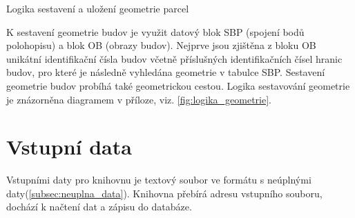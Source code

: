 \begin{algorithm}
\caption{Logika sestavení a uložení geometrie parcel}
\label{alg:sestaveni_parcely}
	\begin{algorithmic}[1]
		\ENDFOR
		\ELSE
		\ENDIF
	\ENDFOR
	\end{algorithmic}
\end{algorithm}

K sestavení geometrie budov je využit datový blok SBP (spojení bodů polohopisu) a blok OB (obrazy budov). Nejprve jsou zjištěna z bloku OB unikátní identifikační čísla budov včetně příslušných identifikačních čísel hranic budov, pro které je následně vyhledána geometrie v tabulce SBP. Sestavení geometrie budov probíhá také geometrickou cestou. Logika sestavování geometrie je znázorněna diagramem v příloze, viz. \ref{fig:logika_geometrie}.

\section{Vstupní data}
Vstupními daty pro knihovnu je textový soubor ve formátu  s neúplnými daty(\ref{subsec:neuplna_data}). Knihovna přebírá adresu vstupního souboru, dochází k načtení dat a zápisu do databáze.

